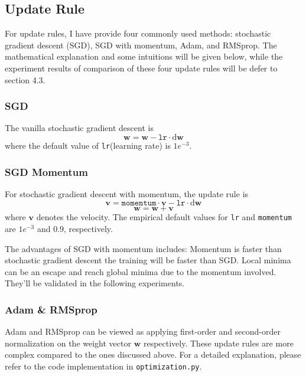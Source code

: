 \documentclass[10pt,a4paper,twoside]{tau}
\renewcommand{\vec}[1]{\mathbf{#1}}
\renewcommand{\d}{\text{d}}
\begin{document}
\subsection{Update Rule}

For update rules, I have provide four commonly used methods: stochastic gradient descent (SGD), SGD with momentum, Adam, and RMSprop. The mathematical explanation and some intuitions will be given below, while the experiment results of comparison of these four update rules will be defer to section 4.3.

\subsubsection{SGD}

The vanilla stochastic gradient descent is
\begin{equation}
    \vec{w} = \vec{w} - \texttt{lr} \cdot\d \vec{w} \tag{4.1.1}
\end{equation}
where the default value of \texttt{lr}(learning rate) is $1e^{-3}$.

\subsubsection{SGD Momentum}

For stochastic gradient descent with momentum, the update rule is 
\begin{equation}
    \vec{v} = \texttt{momentum} \cdot\vec{v} - \texttt{lr} \cdot\d\vec{w} \tag{4.1.2}
\end{equation}
\begin{equation}
    \vec{w} = \vec{w} + \vec{v} \tag{4.1.3}
\end{equation}
where $\vec{v}$ denotes the velocity. The empirical default values for \texttt{lr} and \texttt{momentum} are $1e^{-3}$ and $0.9$, respectively.

The advantages of SGD with momentum includes:
Momentum is faster than stochastic gradient descent the training will be faster than SGD. Local minima can be an escape and reach global minima due to the momentum involved. They'll be validated in the following experiments.

\subsubsection{Adam \& RMSprop}
Adam and RMSprop can be viewed as applying first-order and second-order normalization on the weight vector $\vec{w}$ respectively. These update rules are more complex compared to the ones discussed above. For a detailed explanation, please refer to the code implementation in \texttt{optimization.py}.
\end{document}
